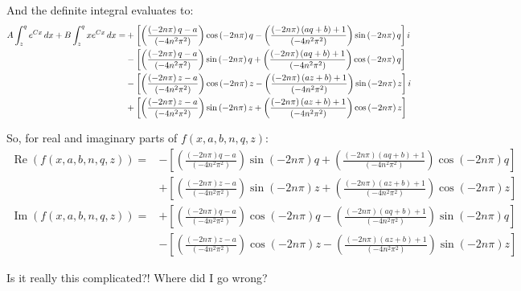 \documentclass[10pt]{article}%
\begin{document}
\divider

And the definite integral evaluates to:
\begin{align}
A \int_{z}^{q}{e^{Cx} \,dx} + B\int_{z}^{q}{x e^{Cx} \,dx} =
 &+ \left[ \left(\frac{\left(-2n\pi\right)q - a}{\left(-4n^{2}\pi^{2}\right)} \right) \cos{\left(-2n\pi\right)q} 
 - \left(\frac{\left(-2n\pi\right)\left(aq + b\right) + 1}{\left(-4n^{2}\pi^{2}\right)}\right) \sin{\left(-2n\pi\right)q} \right] i \\
 &- \left[ \left(\frac{\left(-2n\pi\right)q - a}{\left(-4n^{2}\pi^{2}\right)} \right) \sin{\left(-2n\pi\right)q} 
 + \left(\frac{\left(-2n\pi\right)\left(aq + b\right) + 1}{\left(-4n^{2}\pi^{2}\right)}\right) \cos{\left(-2n\pi\right)q} \right] \\
 &- \left[ \left(\frac{\left(-2n\pi\right)z - a}{\left(-4n^{2}\pi^{2}\right)} \right) \cos{\left(-2n\pi\right)z} 
 - \left(\frac{\left(-2n\pi\right)\left(az + b\right) + 1}{\left(-4n^{2}\pi^{2}\right)}\right) \sin{\left(-2n\pi\right)z} \right] i \\
 &+ \left[ \left(\frac{\left(-2n\pi\right)z - a}{\left(-4n^{2}\pi^{2}\right)} \right) \sin{\left(-2n\pi\right)z} 
 + \left(\frac{\left(-2n\pi\right)\left(az + b\right) + 1}{\left(-4n^{2}\pi^{2}\right)}\right) \cos{\left(-2n\pi\right)z} \right]
\end{align}

\divider

So, for real and imaginary parts of $f(x, a, b, n, q, z)$:
\begin{align}
\operatorname{Re}\left(f(x, a, b, n, q, z)\right) = &- \left[ \left(\frac{\left(-2n\pi\right)q - a}{\left(-4n^{2}\pi^{2}\right)} \right) \sin{\left(-2n\pi\right)q} 
 + \left(\frac{\left(-2n\pi\right)\left(aq + b\right) + 1}{\left(-4n^{2}\pi^{2}\right)}\right) \cos{\left(-2n\pi\right)q} \right] \\
 &+ \left[ \left(\frac{\left(-2n\pi\right)z - a}{\left(-4n^{2}\pi^{2}\right)} \right) \sin{\left(-2n\pi\right)z} 
 + \left(\frac{\left(-2n\pi\right)\left(az + b\right) + 1}{\left(-4n^{2}\pi^{2}\right)}\right) \cos{\left(-2n\pi\right)z} \right] \\
\operatorname{Im}\left(f(x, a, b, n, q, z)\right) = &+ \left[ \left(\frac{\left(-2n\pi\right)q - a}{\left(-4n^{2}\pi^{2}\right)} \right) \cos{\left(-2n\pi\right)q} 
 - \left(\frac{\left(-2n\pi\right)\left(aq + b\right) + 1}{\left(-4n^{2}\pi^{2}\right)}\right) \sin{\left(-2n\pi\right)q} \right] \\
 &- \left[ \left(\frac{\left(-2n\pi\right)z - a}{\left(-4n^{2}\pi^{2}\right)} \right) \cos{\left(-2n\pi\right)z} 
 - \left(\frac{\left(-2n\pi\right)\left(az + b\right) + 1}{\left(-4n^{2}\pi^{2}\right)}\right) \sin{\left(-2n\pi\right)z} \right]
\end{align}

\divider

Is it really this complicated?! Where did I go wrong?

\end{document}
